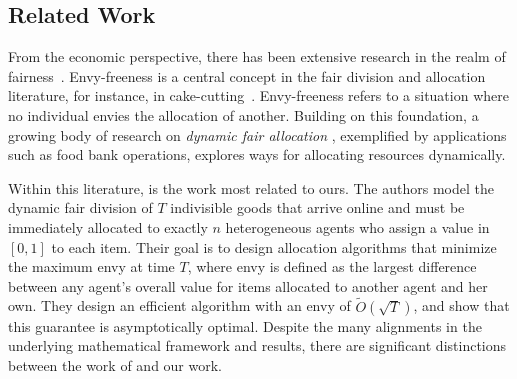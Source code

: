 \subsection{Related Work}
\label{sec: rw}
From the economic perspective, there has been extensive research in the realm of fairness~\cite{conitzer2017fair, Kahneman86, shapley_shubik_1954, dubey1975uniqueness,shapley1974cores, shapley1971cores}. Envy-freeness is a central concept in the fair division and allocation literature, for instance, in cake-cutting~\cite{Steven95,aziz2016discrete,cohler2011optimal}. Envy-freeness refers to a situation where no individual envies the allocation of another. 
Building on this foundation, a growing body of research on \emph{dynamic fair allocation} \cite{hassanzadeh2023sequential, benade2018make,kash2014no,zeng2020tradeoffs,sinclair2022sequential}, exemplified by applications such as food bank operations, explores ways for allocating resources dynamically. %

Within this literature, \citet{benade2018make} is the work most related to ours. The authors model the dynamic fair division of $T$ indivisible goods that arrive online and must be immediately allocated to exactly $n$ heterogeneous agents who assign a value in $[0,1]$ to each item. Their goal is to design allocation algorithms that minimize the maximum envy at time $T$, where envy is defined as the largest difference between any agent's overall value for items allocated to another agent and her own. They design an efficient algorithm with an envy of $\tilde O(\sqrt{T})$, and show that this guarantee is asymptotically optimal. Despite the many alignments in the underlying mathematical framework and results, there are significant distinctions between the work of \citet{benade2018make} and our work.  

